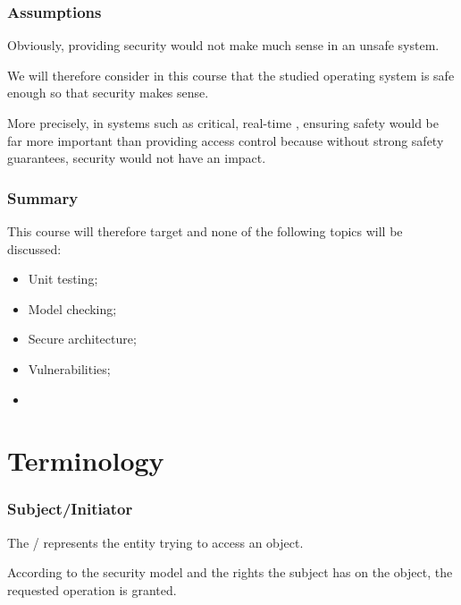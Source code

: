 
\begin{frame}
  \frametitle{Assumptions}

  Obviously, providing security would not make much sense in an unsafe
  system.

  \-

  We will therefore consider in this course that the studied operating system
  is safe enough so that security makes sense.

  \-

  More precisely, in systems such as critical, real-time \etc{},
  ensuring safety would be far more important than providing access control
  because without strong safety guarantees, security would not have an impact.
\end{frame}


\begin{frame}
  \frametitle{Summary}

  This course will therefore target  and none of
  the following topics will be discussed:

  \-

  \begin{itemize}
    \item
      Unit testing;
    \item
      Model checking;
    \item
      Secure architecture;
    \item
      Vulnerabilities;
    \item
      \etc{}
  \end{itemize}
\end{frame}

%
%

\section{Terminology}


\begin{frame}
  \frametitle{Subject/Initiator}

  The / represents the entity trying to access
  an object.

  \-

  According to the security model and the rights the subject has on the
  object, the requested operation is granted.
\end{frame}

